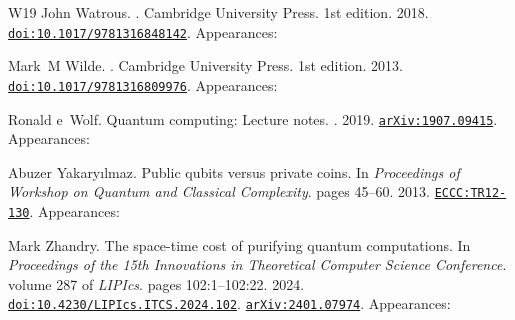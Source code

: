 \documentclass[10pt,a4paper]{article}
\numberwithin{equation}{section}
\numberwithin{figure}{section}
\begin{document}
\begin{thebibliography}{{}W19}
John Watrous.
.
\newblock Cambridge University Press. 1st edition. 2018.
\newblock \href {https://doi.org/10.1017/9781316848142} {\texttt{doi:10.1017/9781316848142}}. Appearances:\!

Mark~M Wilde.
.
\newblock Cambridge University Press. 1st edition. 2013.
\newblock \href {https://doi.org/10.1017/9781316809976} {\texttt{doi:10.1017/9781316809976}}. Appearances:\!

Ronald {}e~Wolf.
\newblock Quantum computing: {L}ecture notes.
. 2019.
\newblock \href {https://arxiv.org/abs/1907.09415} {\texttt{arXiv:1907.09415}}. Appearances:\!

Abuzer Yakary{\i}lmaz.
\newblock Public qubits versus private coins.
\newblock In {\em Proceedings of Workshop on Quantum and Classical Complexity}. pages 45--60. 2013.
\newblock \href {https://eccc.weizmann.ac.il/report/2012/130} {\texttt{ECCC:TR12-130}}. Appearances:\!

Mark Zhandry.
\newblock The space-time cost of purifying quantum computations.
\newblock In {\em Proceedings of the 15th Innovations in Theoretical Computer Science Conference}. volume 287 of {\em LIPIcs}. pages 102:1--102:22. 2024.
\newblock \href {https://doi.org/10.4230/LIPIcs.ITCS.2024.102} {\texttt{doi:10.4230/LIPIcs.ITCS.2024.102}}. \href {https://arxiv.org/abs/2401.07974} {\texttt{arXiv:2401.07974}}. Appearances:\!

\end{thebibliography}
\end{document}
